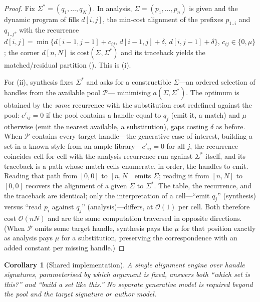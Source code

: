 \documentclass[11pt,twocolumn,a4paper]{article}
\theoremstyle{thmstyle}
\newtheorem{corollary}[theorem]{Corollary}
\theoremstyle{definition}
\theoremstyle{remark}
\newcommand{\sig}{\Sigma}
\newcommand{\algn}{a}
\newcommand{\bigOh}{\mathcal{O}}
\begin{document}
\begin{proof}
Fix $\sig^{\ast}=(q_1,\dots,q_N)$. In analysis, $\sig=(p_1,\dots,p_n)$ is given
and the dynamic program of  fills $d[i,j]$, the min-cost
alignment of the prefixes $p_{1..i}$ and $q_{1..j}$, with the recurrence
$d[i,j]=\min\{d[i-1,j-1]+c_{ij},\,d[i-1,j]+\delta,\,d[i,j-1]+\delta\}$,
$c_{ij}\in\{0,\mu\}$; the corner $d[n,N]$ is $\mathrm{cost}(\sig,\sig^{\ast})$ and
its traceback yields the matched/residual partition (). This
is (i).

For (ii), synthesis fixes $\sig^{\ast}$ and asks for a constructible
$\sig$---an ordered selection of handles from the available pool $\mathcal{P}$---
minimising $\algn(\sig,\sig^{\ast})$. The optimum is obtained by the \emph{same}
recurrence with the substitution cost redefined against the pool:
$c'_{ij}=0$ if the pool contains a handle equal to $q_j$ (emit it, a match) and
$\mu$ otherwise (emit the nearest available, a substitution), gaps costing
$\delta$ as before. When $\mathcal{P}$ contains every target handle---the
generative case of interest, building a set in a known style from an ample
library---$c'_{ij}=0$ for all $j$, the recurrence coincides cell-for-cell with the
analysis recurrence run against $\sig^{\ast}$ itself, and its traceback is a path
whose match cells enumerate, in order, the handles to emit. Reading that path
from $[0,0]$ to $[n,N]$ emits $\sig$; reading it from $[n,N]$ to $[0,0]$ recovers
the alignment of a given $\sig$ to $\sig^{\ast}$. The table, the recurrence, and
the traceback are identical; only the interpretation of a cell---``emit
$q_j$'' (synthesis) versus ``read $p_i$ against $q_j$'' (analysis)---differs, at
$\bigOh(1)$ per cell. Both therefore cost $\bigOh(nN)$ and are the same
computation traversed in opposite directions. (When $\mathcal{P}$ omits some
target handle, synthesis pays the $\mu$ for that position exactly as analysis
pays $\mu$ for a substitution, preserving the correspondence with an added
constant per missing handle.)
\end{proof}

\begin{corollary}[Shared implementation]
\label{cor:shared}
A single alignment engine over handle signatures, parameterised by which argument
is fixed, answers both ``which set is this?'' and ``build a set like this.'' No
separate generative model is required beyond the pool and the target signature or
author model.
\end{corollary}
\end{document}
